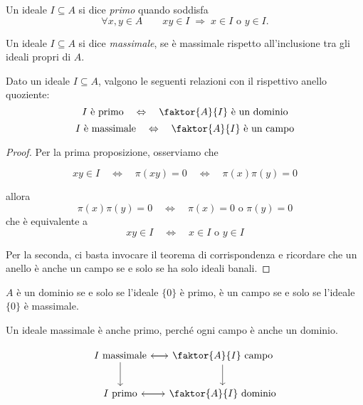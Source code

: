 \begin{multicols}{2}
\begin{definition}
	Un ideale $ I \subseteq A $ si dice \emph{primo} quando soddisfa
	\[ \forall x, y \in A \qquad xy \in I \;\Rightarrow\; x \in I \text{ o } y \in I. \]
\end{definition}

\begin{definition}
	Un ideale $ I \subseteq A $ si dice \emph{massimale}, se è massimale rispetto all'inclusione tra gli ideali propri di $ A $.
\end{definition}

\begin{theorem}\label{idealequoziente}
	Dato un ideale $ I \subseteq A $, valgono le seguenti relazioni con il rispettivo anello quoziente:
	\[ I \text{ è primo} \quad\Leftrightarrow\quad \faktor{A}{I} \text{ è  un dominio} \]
	\[ I \text{ è massimale} \quad\Leftrightarrow\quad \faktor{A}{I} \text{ è un campo} \]
\end{theorem}

\begin{proof}
	Per la prima proposizione, osserviamo che
	
	\[xy \in I \quad\Leftrightarrow\quad \pi(xy) = 0 
	\quad\Leftrightarrow\quad \pi(x)\pi(y) = 0 \]
	
	allora
	\[ \pi(x)\pi(y) = 0 \quad\Leftrightarrow\quad \pi(x) =0 \text{ o } \pi(y) = 0   \]
	che è equivalente a 
	\[ xy \in I \quad\Leftrightarrow\quad x \in I \text{ o } y \in I  \]
	
	Per la seconda, ci basta invocare il teorema di corrispondenza e ricordare che un anello è anche un campo se e solo se ha solo ideali banali.
\end{proof}

\begin{remark}
	$ A $ è un dominio se e solo se l'ideale $ \{0\} $ è primo, è un campo se e solo se l'ideale $ \{0\} $ è massimale.
\end{remark}
\begin{remark}
	Un ideale massimale è anche primo, perché ogni campo è anche un dominio.
\end{remark}

\[ \begin{tikzcd}[row sep=0.75cm, column sep=0.5 cm]
I \text{ massimale} \arrow{r} \arrow[swap]{d} &  \faktor{A}{I} \text{ campo} \arrow{l} \arrow[swap]{d} \\
I \text{ primo} \arrow{r}  &  \faktor{A}{I} \text{ dominio} \arrow{l}
\end{tikzcd} \]


\end{multicols}

